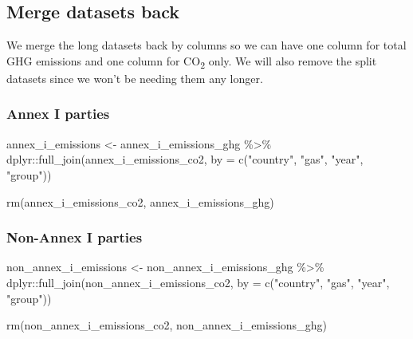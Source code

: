 \documentclass[
  12pt,
]{article}
\newenvironment{Shaded}{}{}
\newcommand{\AttributeTok}[1]{\textcolor[rgb]{0.49,0.56,0.16}{#1}}
\newcommand{\FunctionTok}[1]{\textcolor[rgb]{0.02,0.16,0.49}{#1}}
\newcommand{\NormalTok}[1]{#1}
\newcommand{\OtherTok}[1]{\textcolor[rgb]{0.00,0.44,0.13}{#1}}
\newcommand{\SpecialCharTok}[1]{\textcolor[rgb]{0.25,0.44,0.63}{#1}}
\newcommand{\StringTok}[1]{\textcolor[rgb]{0.25,0.44,0.63}{#1}}
\begin{document}
\hypertarget{merge-datasets-back}{%
\subsection{Merge datasets back}\label{merge-datasets-back}}

We merge the long datasets back by columns so we can have one column for
total GHG emissions and one column for CO\textsubscript{2} only. We will
also remove the split datasets since we won't be needing them any
longer.

\hypertarget{annex-i-parties-4}{%
\subsubsection{Annex I parties}\label{annex-i-parties-4}}

\begin{Shaded}
\begin{Highlighting}[]
\NormalTok{annex\_i\_emissions }\OtherTok{\textless{}{-}}\NormalTok{ annex\_i\_emissions\_ghg }\SpecialCharTok{\%\textgreater{}\%}
\NormalTok{    dplyr}\SpecialCharTok{::}\FunctionTok{full\_join}\NormalTok{(annex\_i\_emissions\_co2, }
        \AttributeTok{by =} \FunctionTok{c}\NormalTok{(}\StringTok{"country"}\NormalTok{, }\StringTok{"gas"}\NormalTok{, }\StringTok{"year"}\NormalTok{, }
            \StringTok{"group"}\NormalTok{))}

\FunctionTok{rm}\NormalTok{(annex\_i\_emissions\_co2, annex\_i\_emissions\_ghg)}
\end{Highlighting}
\end{Shaded}

\hypertarget{non-annex-i-parties-4}{%
\subsubsection{Non-Annex I parties}\label{non-annex-i-parties-4}}

\begin{Shaded}
\begin{Highlighting}[]
\NormalTok{non\_annex\_i\_emissions }\OtherTok{\textless{}{-}}\NormalTok{ non\_annex\_i\_emissions\_ghg }\SpecialCharTok{\%\textgreater{}\%}
\NormalTok{    dplyr}\SpecialCharTok{::}\FunctionTok{full\_join}\NormalTok{(non\_annex\_i\_emissions\_co2, }
        \AttributeTok{by =} \FunctionTok{c}\NormalTok{(}\StringTok{"country"}\NormalTok{, }\StringTok{"gas"}\NormalTok{, }\StringTok{"year"}\NormalTok{, }
            \StringTok{"group"}\NormalTok{))}

\FunctionTok{rm}\NormalTok{(non\_annex\_i\_emissions\_co2, non\_annex\_i\_emissions\_ghg)}
\end{Highlighting}
\end{Shaded}
\end{document}
